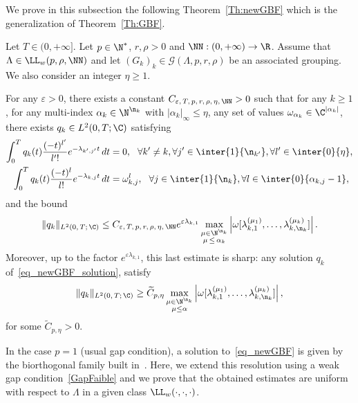 We prove in this subsection the following Theorem~\ref{Th:newGBF} which is the generalization of Theorem~\ref{Th:GBF}.
\begin{theo} \label{Th:newGBF}
Let $T \in (0,+\infty]$. Let $p \in \N^*$, $r, \rho > 0$ and $\NN : (0,+\infty) \to \R$. Assume that $\Lambda \in \LL_w(p,\rho, \NN)$ and let $(G_k)_k\in \mathcal{G}(\Lambda,p,r,\rho)$ be an associated grouping. We also consider an integer $\eta\geq 1$.

For any $\varepsilon > 0$, there exists a constant $C_{\varepsilon,\, T,\, p,\, r,\, \rho,\, \eta,\, \NN} >0$ such that for any $k \geq 1$, for any multi-index $\alpha_k\in \N^{\n_k}$ with $|\alpha_k|_\infty\leq \eta$, any set of values $\omega_{\alpha_k} \in \C^{|\alpha_k|}$, there exists $q_k \in L^2(0,T; \C)$ satisfying
\begin{subequations}\label{eq_newGBF}
\begin{align}
\int_0^{T} q_k(t) \frac{(-t)^{l'}}{l'!} e^{-\lambda_{k',j'}t} \, dt & = 0, \ \ \forall k'\neq k, \forall j'\in \inter{1}{\n_{k'}}, \forall l'\in \inter{0}{\eta}, \label{eq_newGBF_orthogonalite}
\\
\int_0^{T} q_k(t) \frac{(-t)^l}{l!} e^{-\lambda_{k,j}t} \, dt & = \omega_{k,j}^l, \ \ \forall j\in \inter{1}{\n_{k}}, \forall l\in \inter{0}{\alpha_{k,j}-1}, \label{eq_newGBF_solution}
\end{align}
\end{subequations}
and the bound
\begin{equation}\label{bound_qk_multiplicities}
\|q_k\|_{L^2(0,\,T;\,\C)}\leq C_{\varepsilon,\, T,\, p,\, r,\, \rho,\, \eta,\, \NN} e^{\varepsilon \lambda_{k,1}} \max\limits_{\substack{\mu\in \N^{\n_k} \\ \mu\,\leq\,\alpha_k}} \left| \omega[\lambda_{k,1}^{(\mu_1)},\dotsc,\lambda_{k,\n_k}^{(\mu_k)}] \right|.
\end{equation}
Moreover, up to the factor $e^{\varepsilon \lambda_{k,1}}$, this last estimate is sharp: any solution $q_k$ of~\eqref{eq_newGBF_solution}, satisfy
\begin{equation}\label{lower_bound_qk_multiplicities}
\|q_k\|_{L^2(0,\,T;\,\C)} \geq \widetilde{C}_{p, \eta} \max\limits_{\substack{\mu\in \N^{\n_k} \\ \mu\leq \alpha}} \left| \omega[\lambda_{k,1}^{(\mu_1)},\dotsc,\lambda_{k,\n_k}^{(\mu_k)}] \right|,
\end{equation}
for some $\widetilde{C}_{p, \eta}>0$.
\end{theo}

In the case $p=1$ (usual gap condition), a solution to~\eqref{eq_newGBF} is given by the biorthogonal family built in~\cite{AKBGBDT_Kalman}. Here, we extend this resolution using a weak gap condition~\eqref{GapFaible} and we prove that the obtained estimates are uniform with respect to $\Lambda$ in a given class $\LL_w(\cdot, \cdot, \cdot)$.


